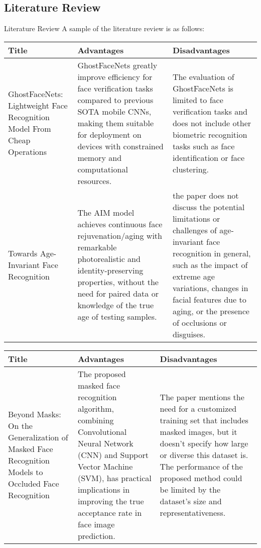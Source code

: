 \subsection{Literature Review}
\begin{frame}[allowframebreaks]{Literature Review}
	A sample of the literature review is as follows:
	{
		\scriptsize
		\newlength{\limwidth}
		\setlength{\limwidth}{5.75cm}
		\begin{table}[htbp]
			\begin{center}
			\begin{tabularx}{\columnwidth}{|X|X|X|}
			\hline
			\textbf{Title} & \textbf{Advantages}& \textbf{Disadvantages} \\
			\hline
			GhostFaceNets: Lightweight Face Recognition Model From Cheap Operations \cite{alansari_ghostfacenets_2023} & GhostFaceNets greatly improve efficiency for face verification tasks compared to previous SOTA mobile CNNs, making them suitable for deployment on devices with constrained memory and computational resources. & The evaluation of GhostFaceNets is limited to face verification tasks and does not include other biometric recognition tasks such as face identification or face clustering.
			\\
			\hline
			Towards Age-Invariant Face Recognition \cite{zhao_towards_2022} & The AIM model achieves continuous face rejuvenation/aging with remarkable photorealistic and identity-preserving properties, without the need for paired data or knowledge of the true age of testing samples. & the paper does not discuss the potential limitations or challenges of age-invariant face recognition in general, such as the impact of extreme age variations, changes in facial features due to aging, or the presence of occlusions or disguises.\\
			\hline
		\end{tabularx}
		\end{center}
		\end{table}			
	\pagebreak
		\begin{table}[htbp]
			\begin{center}
			\begin{tabularx}{\columnwidth}{|X|X|X|}
			\hline
			\textbf{Title} & \textbf{Advantages}& \textbf{Disadvantages} \\
			\hline
			Beyond Masks: On the Generalization of Masked Face Recognition Models to Occluded Face Recognition \cite{pedro_neto_beyond_2022} & The proposed masked face recognition algorithm, combining Convolutional Neural Network (CNN) and Support Vector Machine (SVM), has practical implications in improving the true acceptance rate in face image prediction. & The paper mentions the need for a customized training set that includes masked images, but it doesn't specify how large or diverse this dataset is. The performance of the proposed method could be limited by the dataset's size and representativeness.

\end{tabularx}
\end{center}
\end{table}}
\end{frame}
